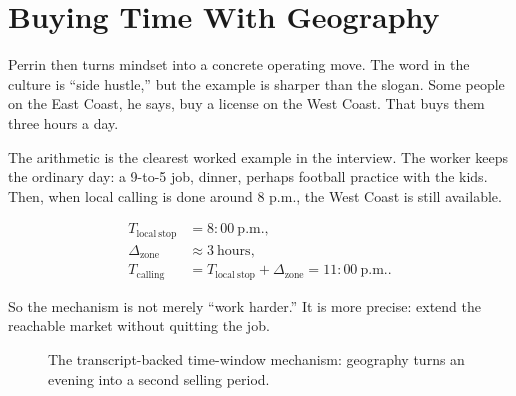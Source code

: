 \section{Buying Time With Geography}

Perrin then turns mindset into a concrete operating move. The word in the culture is ``side hustle,'' but the example is sharper than the slogan. Some people on the East Coast, he says, buy a license on the West Coast. That buys them three hours a day.

The arithmetic is the clearest worked example in the interview. The worker keeps the ordinary day: a 9-to-5 job, dinner, perhaps football practice with the kids. Then, when local calling is done around 8 p.m., the West Coast is still available.

\begin{align}
T_{\mathrm{local\ stop}} &= 8{:}00\ \mathrm{p.m.},\\
\Delta_{\mathrm{zone}} &\approx 3\ \mathrm{hours},\\
T_{\mathrm{calling}} &= T_{\mathrm{local\ stop}}+\Delta_{\mathrm{zone}}
                     = 11{:}00\ \mathrm{p.m.}.
\end{align}

So the mechanism is not merely ``work harder.'' It is more precise: extend the reachable market without quitting the job.

\begin{figure}
\centering
{}
\caption{The transcript-backed time-window mechanism: geography turns an evening into a second selling period.}
\end{figure}

